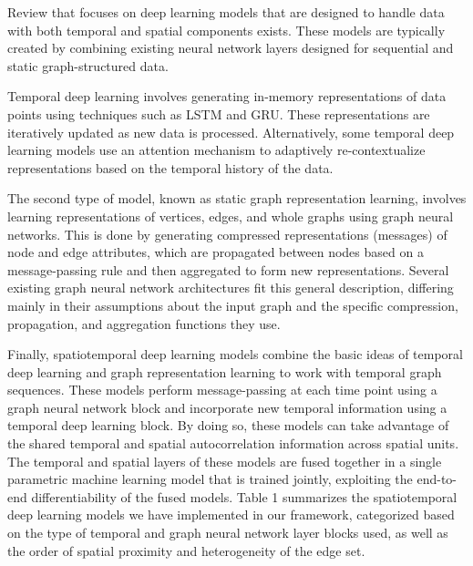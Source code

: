 Review that focuses on deep learning models that are designed to handle data with both temporal and spatial components exists. These models are typically created by combining existing neural network layers designed for sequential and static graph-structured data.

Temporal deep learning involves generating in-memory representations of data points using techniques such as LSTM and GRU. These representations are iteratively updated as new data is processed. Alternatively, some temporal deep learning models use an attention mechanism to adaptively re-contextualize representations based on the temporal history of the data.

The second type of model, known as static graph representation learning, involves learning representations of vertices, edges, and whole graphs using graph neural networks. This is done by generating compressed representations (messages) of node and edge attributes, which are propagated between nodes based on a message-passing rule and then aggregated to form new representations. Several existing graph neural network architectures fit this general description, differing mainly in their assumptions about the input graph and the specific compression, propagation, and aggregation functions they use.

Finally, spatiotemporal deep learning models combine the basic ideas of temporal deep learning and graph representation learning to work with temporal graph sequences. These models perform message-passing at each time point using a graph neural network block and incorporate new temporal information using a temporal deep learning block. By doing so, these models can take advantage of the shared temporal and spatial autocorrelation information across spatial units. The temporal and spatial layers of these models are fused together in a single parametric machine learning model that is trained jointly, exploiting the end-to-end differentiability of the fused models. Table 1 summarizes the spatiotemporal deep learning models we have implemented in our framework, categorized based on the type of temporal and graph neural network layer blocks used, as well as the order of spatial proximity and heterogeneity of the edge set.\cite{rozemberczki2021pytorch}



